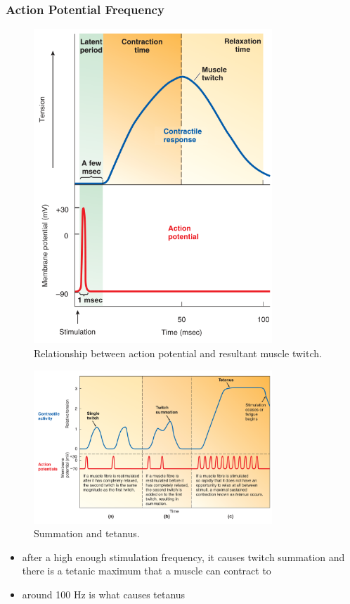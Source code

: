 \documentclass[10pt]{article}
\begin{document}
\subsubsection{Action Potential Frequency}
\begin{figure}[H]
    \centering
    \includegraphics[width=0.8\textwidth]{muscleActionPotential}
    \caption{Relationship between action potential and resultant muscle twitch.}
    \label{fig:muscleActionPotential}
\end{figure}
\begin{figure}[H]
    \centering
    \includegraphics[width=0.8\textwidth]{summationTetanus}
    \caption{Summation and tetanus.}
    \label{fig:summationTetanus}
\end{figure}
\begin{itemize}
    \item after a high enough stimulation frequency, it causes twitch summation and there is a tetanic maximum that a muscle can contract to
    \item around 100 Hz is what causes tetanus
\end{itemize}
\end{document}

